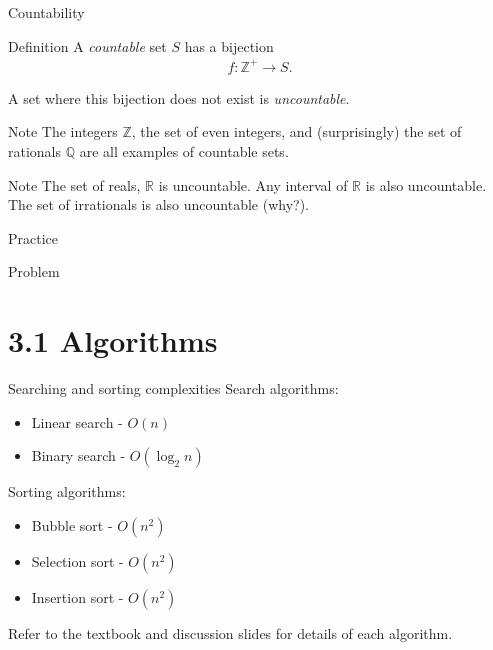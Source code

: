 \documentclass[dvipsnames,t]{beamer}
\begin{document}
\begin{frame}{Countability}
\begin{block}{Definition}
	A \textit{countable} set $S$ has a bijection
	\begin{align*}
	f\colon \mathbb{Z}^+ \rightarrow S.
	\end{align*}
	
	A set where this bijection does not exist is \textit{uncountable}.
\end{block}
\begin{block}{Note}
	The integers $\mathbb{Z}$, the set of even integers, and (surprisingly) the set of rationals $\mathbb{Q}$ are all examples of countable sets.
\end{block}
\begin{block}{Note}
	The set of reals, $\mathbb{R}$ is uncountable. Any interval of $\mathbb{R}$ is also uncountable. The set of irrationals is also uncountable (why?).
\end{block}
\end{frame}


\begin{frame}{Practice}
\begin{block}{Problem}

\end{block}
\end{frame}

\section{3.1 Algorithms}

\begin{frame}{Searching and sorting complexities}
Search algorithms:
\begin{itemize}
\item Linear search - $O(n)$
\item Binary search - $O(\log_2{n})$
\end{itemize}
Sorting algorithms:
\begin{itemize}
\item Bubble sort - $O(n^2)$
\item Selection sort - $O(n^2)$
\item Insertion sort - $O(n^2)$
\end{itemize}

Refer to the textbook and discussion slides for details of each algorithm.
\end{frame}
\end{document}
